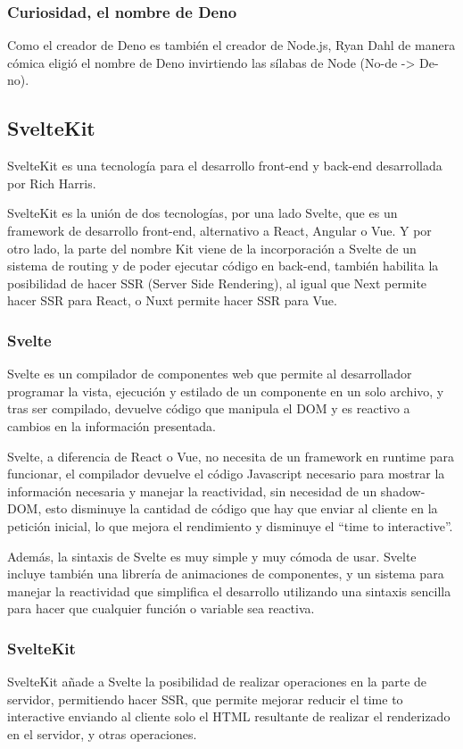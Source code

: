 \subsubsection{Curiosidad, el nombre de Deno}
Como el creador de Deno es también el creador de Node.js, Ryan Dahl de manera cómica eligió el nombre de Deno invirtiendo las sílabas de Node (No-de -> De-no).


\subsection{SvelteKit}
SvelteKit \cite{sveltekit_docs} es una tecnología para el desarrollo front-end y back-end desarrollada por Rich Harris.

SvelteKit es la unión de dos tecnologías, por una lado Svelte, que es un framework de desarrollo front-end, alternativo a React, Angular o Vue. Y por otro lado, la parte del nombre Kit viene de la incorporación a Svelte de un sistema de routing y de poder ejecutar código en back-end, también habilita la posibilidad de hacer SSR (Server Side Rendering), al igual que Next permite hacer SSR para React, o Nuxt permite hacer SSR para Vue.

\subsubsection{Svelte}
Svelte \cite{svelte_docs} es un compilador de componentes web que permite al desarrollador programar la vista, ejecución y estilado de un componente en un solo archivo, y tras ser compilado, devuelve código que manipula el DOM y es reactivo a cambios en la información presentada.

Svelte, a diferencia de React o Vue, no necesita de un framework en runtime para funcionar, el compilador devuelve el código Javascript necesario para mostrar la información necesaria y manejar la reactividad, sin necesidad de un shadow-DOM, esto disminuye la cantidad de código que hay que enviar al cliente en la petición inicial, lo que mejora el rendimiento y disminuye el “time to interactive”.

Además, la sintaxis de Svelte es muy simple y muy cómoda de usar. Svelte incluye también una librería de animaciones de componentes, y un sistema para manejar la reactividad que simplifica el desarrollo utilizando una sintaxis sencilla para hacer que cualquier función o variable sea reactiva.

\subsubsection{SvelteKit}
SvelteKit añade a Svelte la posibilidad de realizar operaciones en la parte de servidor, permitiendo hacer SSR, que permite mejorar reducir el time to interactive enviando al cliente solo el HTML resultante de realizar el renderizado en el servidor, y otras operaciones.

